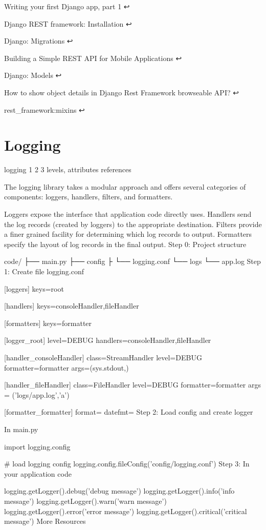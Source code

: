 Writing your first Django app, part 1 ↩

Django REST framework: Installation ↩

Django: Migrations ↩

Building a Simple REST API for Mobile Applications ↩

Django: Models ↩

How to show object details in Django Rest Framework browseable API? ↩

rest_framework:mixins ↩

\section{Logging}

logging 1 2 3
levels, attributes references

The logging library takes a modular approach and offers several categories of components: loggers, handlers, filters, and formatters.

Loggers expose the interface that application code directly uses.
Handlers send the log records (created by loggers) to the appropriate destination.
Filters provide a finer grained facility for determining which log records to output.
Formatters specify the layout of log records in the final output.
Step 0: Project structure

code/
├── main.py
├── config
├   └── logging.conf
└── logs
    └── app.log
Step 1: Create file logging.conf

[loggers]
keys=root

[handlers]
keys=consoleHandler,fileHandler

[formatters]
keys=formatter

[logger_root]
level=DEBUG
handlers=consoleHandler,fileHandler

[handler_consoleHandler]
class=StreamHandler
level=DEBUG
formatter=formatter
args=(sys.stdout,)

[handler_fileHandler]
class=FileHandler
level=DEBUG
formatter=formatter
args = ('logs/app.log','a')

[formatter_formatter]
format=%
datefmt=
Step 2: Load config and create logger

In main.py

import logging.config

# load logging config
logging.config.fileConfig('config/logging.conf')
Step 3: In your application code

logging.getLogger().debug('debug message')
logging.getLogger().info('info message')
logging.getLogger().warn('warn message')
logging.getLogger().error('error message')
logging.getLogger().critical('critical message')
More Resources

